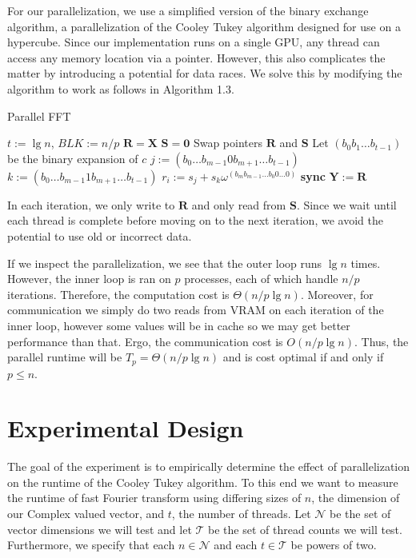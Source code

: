 \documentclass[notitlepage, twocolumn]{article}
\begin{document}
For our parallelization, we use a simplified version of the binary exchange algorithm, a parallelization of the Cooley Tukey algorithm designed for use on a hypercube.
Since our implementation runs on a single GPU, any thread can access any memory location via a pointer.
However, this also complicates the matter by introducing a potential for data races.
We solve this by modifying the algorithm to work as follows in Algorithm 1.3.
\begin{algorithm}
	\caption{Parallel FFT}
	\begin{algorithmic}[1]
			\State $t:=\lg n$, $BLK:=n/p$
			\State $\mathbf{R}=\mathbf{X}$
			\State $\mathbf{S}=\mathbf{0}$
				\State Swap pointers $\mathbf{R}$ and $\mathbf{S}$
						\State Let $(b_0b_1\ldots b_{t-1})$ be the binary expansion of $c$
						\State $j:=(b_0\ldots b_{m-1}0b_{m+1}\ldots b_{t-1})$
						\State $k:=(b_0\ldots b_{m-1}1b_{m+1}\ldots b_{t-1})$
						\State $r_i:= s_j+s_k\omega^{(b_mb_{m-1}\ldots b_0 0\ldots0)}$
					\EndFor
				\EndSpawn
				\State \textbf{sync}
			\EndFor
			\State $\mathbf{Y}:=\mathbf{R}$
		\EndFunction
	\end{algorithmic}
\end{algorithm}
In each iteration, we only write to $\mathbf{R}$ and only read from $\mathbf{S}$.
Since we wait until each thread is complete before moving on to the next iteration, we avoid the potential to use old or incorrect data.

If we inspect the parallelization, we see that the outer loop runs $\lg n$ times.
However, the inner loop is ran on $p$ processes, each of which handle $n/p$ iterations.
Therefore, the computation cost is $\Theta(n/p\lg n)$.
Moreover, for communication we simply do two reads from VRAM on each iteration of the inner loop, however some values will be in cache so we may get better performance than that.
Ergo, the communication cost is $O(n/p\lg n)$.
Thus, the parallel runtime will be $T_p = \Theta(n/p \lg n)$ and is cost optimal if and only if $p\leq n$.

\section{Experimental Design}

The goal of the experiment is to empirically determine the effect of parallelization on the runtime of the Cooley Tukey algorithm.
To this end we want to measure the runtime of fast Fourier transform using differing sizes of $n$, the dimension of our Complex valued vector, and $t$, the number of threads.
Let $\mathcal{N}$ be the set of vector dimensions we will test and let $\mathcal{T}$ be the set of thread counts we will test.
Furthermore, we specify that each $n\in\mathcal{N}$ and each $t\in\mathcal{T}$ be powers of two.
\end{document}
